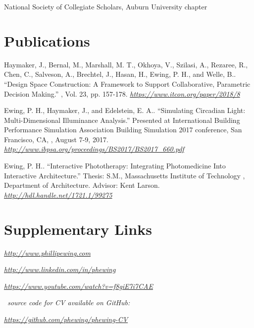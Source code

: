 \documentclass[letterpaper, oneside, 10pt]{article}
\begin{document}
\DotSep{0.25em} National Society of
Collegiate Scholars, Auburn University chapter



\section*{Publications} %

\hangindent=10pt
Haymaker, J., Bernal, M., Marshall, M. T., Okhoya, V., Szilasi, A., Rezaree,
R., Chen, C., Salveson, A., Brechtel, J., Hasan, H., Ewing, P. H., and Welle,
B.. ``Design Space Construction: A Framework to Support
Collaborative, Parametric Decision Making.'' , Vol. 23, pp. 157-178. 
\textit{\url{https://www.itcon.org/paper/2018/8}}

\hangindent=10pt
Ewing, P. H., Haymaker, J., and Edelstein, E. A.. ``Simulating
Circadian Light: Multi-Dimensional Illuminance Analysis.'' Presented at
International Building Performance Simulation Association  Building
Simulation 2017 conference, San Francisco, CA, , August 7-9, 2017.
 \textit{\url{http://www.ibpsa.org/proceedings/BS2017/BS2017_660.pdf}}

\hangindent=10pt
Ewing, P. H.. ``Interactive Phototherapy: Integrating Photomedicine
Into Interactive Architecture.'' Thesis: S.M., Massachusetts Institute of
Technology , Department of Architecture. Advisor: Kent Larson.
 \textit{\url{http://hdl.handle.net/1721.1/99275}}

\suppresstrue

\section*{Supplementary Links} %

\DotSep{0.25em}
\textit{\url{http://www.phillipewing.com}}

\DotSep{0.25em}
\textit{\url{http://www.linkedin.com/in/phewing}}

\DotSep{0.25em}
\textit{\url{https://www.youtube.com/watch?v=f8giE7i7CAE}}

\vfill

\begin{center}

  \textit{\LaTeXe\ source code for CV available on GitHub:}

  \textit{\url{https://github.com/phewing/phewing-CV}}

\end{center}
\end{document}

